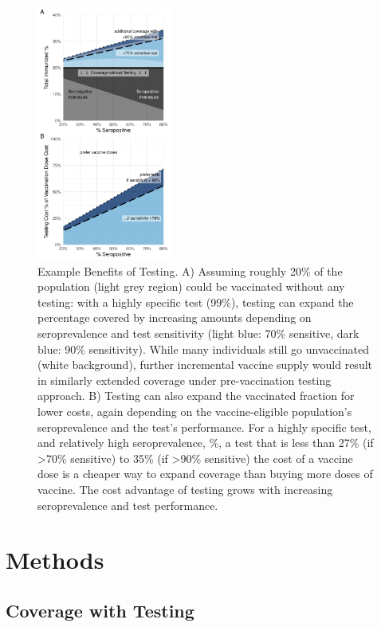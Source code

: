 \documentclass[10pt,a4paper,twocolumn]{article}
\begin{document}
\begin{figure}
\centering
\includegraphics[width=0.4\textwidth]{main.png}
\caption{\label{mainfig}Example Benefits of Testing. A) Assuming roughly 20\% of the population (light grey region) could be vaccinated without any testing: with a highly specific test (99\%), testing can expand the percentage covered by increasing amounts depending on seroprevalence and test sensitivity (light blue: 70\% sensitive, dark blue: 90\% sensitivity). While many individuals still go unvaccinated (white background), further incremental vaccine supply would result in similarly extended coverage under pre-vaccination testing approach. B) Testing can also expand the vaccinated fraction for lower costs, again depending on the vaccine-eligible population's seroprevalence and the test's performance. For a highly specific test, and relatively high seroprevalence, \%, a test that is less than 27\% (if >70\% sensitive) to 35\% (if >90\% sensitive) the cost of a vaccine dose is a cheaper way to expand coverage than buying more doses of vaccine. The cost advantage of testing grows with increasing seroprevalence and test performance.}
\end{figure}

\section*{Methods}

\subsection*{Coverage with Testing}
\end{document}
